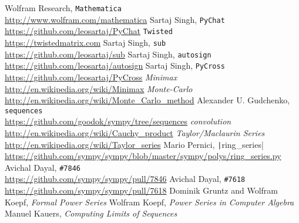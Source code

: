 \documentclass[a4paper,12pt]{article}
\newcommand{\pyline}[1]{\texttt|#1|}
\begin{document}
\begin{thebibliography}{10}
 Wolfram Research, \texttt{Mathematica}
  \hfill\\
  \url{http://www.wolfram.com/mathematica}
 Sartaj Singh, \texttt{PyChat}
  \hfill\\
  \url{https://github.com/leosartaj/PyChat}
 \texttt{Twisted}
  \hfill\\
  \url{https://twistedmatrix.com}
 Sartaj Singh, \texttt{sub}
  \hfill\\
  \url{https://github.com/leosartaj/sub}
 Sartaj Singh, \texttt{autosign}
  \hfill\\
  \url{https://github.com/leosartaj/autosign}
 Sartaj Singh, \texttt{PyCross}
  \hfill\\
  \url{https://github.com/leosartaj/PyCross}
 \textit{Minimax}
  \hfill\\
  \url{http://en.wikipedia.org/wiki/Minimax}
 \textit{Monte-Carlo}
  \hfill\\
  \url{http://en.wikipedia.org/wiki/Monte\_Carlo\_method}
 Alexander U. Gudchenko, \texttt{sequences}
  \hfill\\
  \url{https://github.com/goodok/sympy/tree/sequences}
 \emph{convolution}
  \hfill\\
  \url{http://en.wikipedia.org/wiki/Cauchy\_product}
 \emph{Taylor/Maclaurin Series}
  \hfill\\
  \url{http://en.wikipedia.org/wiki/Taylor\_series}
 Mario Pernici,  \pyline{ring_series}
  \hfill\\
  \url{https://github.com/sympy/sympy/blob/master/sympy/polys/ring_series.py}
 Avichal Dayal, \texttt{\#7846}
  \hfill\\
  \url{https://github.com/sympy/sympy/pull/7846}
 Avichal Dayal, \texttt{\#7618}
  \hfill\\
  \url{https://github.com/sympy/sympy/pull/7618}
 Dominik Gruntz and Wolfram Koepf, \textit{Formal Power Series}
 Wolfram Koepf, \textit{Power Series in Computer Algebra}
 Manuel Kauers, \textit{Computing Limits of Sequences}
\end{thebibliography}
\end{document}
